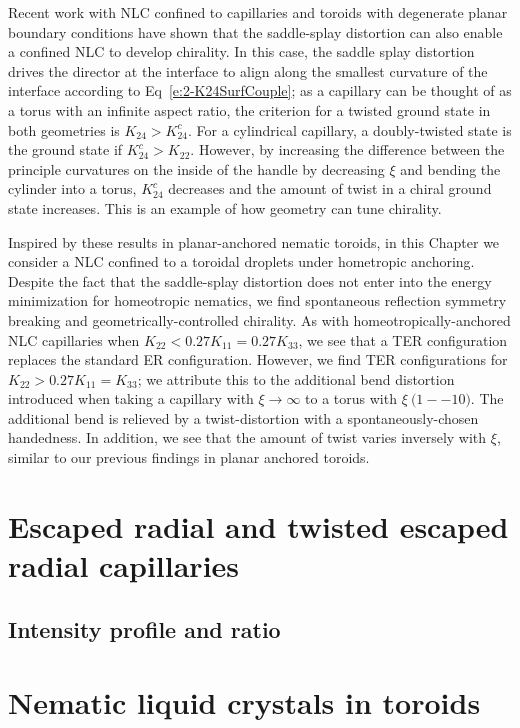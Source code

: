 Recent work with NLC confined to capillaries and toroids with degenerate planar boundary conditions have shown that the saddle-splay distortion can also enable a confined NLC to develop chirality.
In this case, the saddle splay distortion drives the director at the interface to align along the smallest curvature of the interface according to Eq~\ref{e:2-K24SurfCouple}; as a capillary can be thought of as a torus with an infinite aspect ratio, the criterion for a twisted ground state in both geometries is $K_{24} > K^c_{24}$.
For a cylindrical capillary, a doubly-twisted state is the ground state if $K^c_{24}>K_{22}$.
However, by increasing the difference between the principle curvatures on the inside of the handle by decreasing $\xi$ and bending the cylinder into a torus, $K^c_{24}$ decreases and the amount of twist in a chiral ground state increases.
This is an example of how geometry can tune chirality.

Inspired by these results in planar-anchored nematic toroids, in this Chapter we consider a NLC confined to a toroidal droplets under hometropic anchoring.
Despite the fact that the saddle-splay distortion does not enter into the energy minimization for homeotropic nematics, we find spontaneous reflection symmetry breaking and geometrically-controlled chirality.
As with homeotropically-anchored NLC capillaries when $K_{22} < 0.27 K_{11} = 0.27K_{33}$, we see that a TER configuration replaces the standard ER configuration.
However, we find TER configurations for $K_{22} > 0.27 K_{11} = K_{33}$; we attribute this to the additional bend distortion introduced when taking a capillary with $\xi \rightarrow \infty$ to a torus with $\xi ~\mathcal(1--10)$.
The additional bend is relieved by a twist-distortion with a spontaneously-chosen handedness.
In addition, we see that the amount of twist varies inversely with $\xi$, similar to our previous findings in planar anchored toroids.




\section{Escaped radial and twisted escaped radial capillaries}
\subsection{Intensity profile and ratio}


\section{Nematic liquid crystals in toroids}
